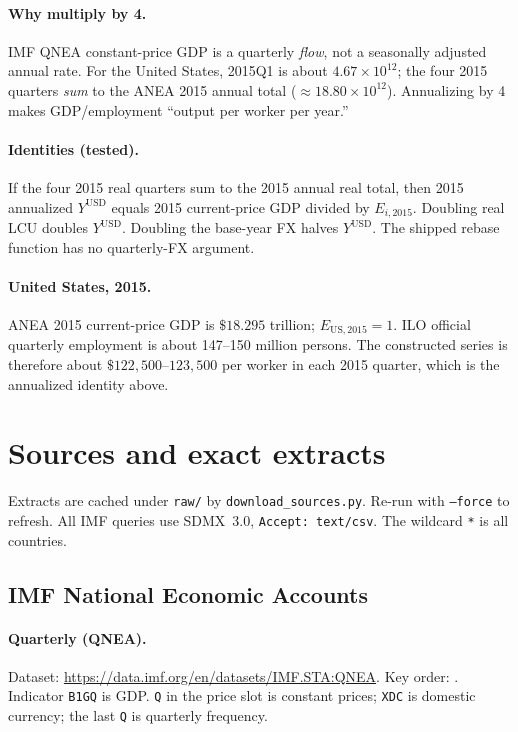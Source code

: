 \documentclass[11pt]{article}
\begin{document}
\paragraph{Why multiply by 4.}
IMF QNEA constant-price GDP is a quarterly \emph{flow}, not a seasonally
adjusted annual rate. For the United States, 2015Q1 is about
$4.67\times 10^{12}$; the four 2015 quarters \emph{sum} to the ANEA 2015 annual
total ($\approx 18.80\times 10^{12}$). Annualizing by 4 makes GDP/employment
``output per worker per year.''

\paragraph{Identities (tested).}
If the four 2015 real quarters sum to the 2015 annual real total, then 2015
annualized $Y^{\mathrm{USD}}$ equals 2015 current-price GDP divided by
$E_{i,2015}$. Doubling real LCU doubles $Y^{\mathrm{USD}}$. Doubling the
base-year FX halves $Y^{\mathrm{USD}}$. The shipped rebase function has no
quarterly-FX argument.

\paragraph{United States, 2015.}
ANEA 2015 current-price GDP is $\$18.295$ trillion; $E_{\mathrm{US},2015}=1$.
ILO official quarterly employment is about 147--150 million persons. The
constructed series is therefore about $\$122{,}500$--$123{,}500$ per worker in
each 2015 quarter, which is the annualized identity above.

\section{Sources and exact extracts}
\label{sec:sources}

Extracts are cached under \texttt{raw/} by \texttt{download\_sources.py}.
Re-run with \texttt{--force} to refresh. All IMF queries use SDMX~3.0,
\texttt{Accept: text/csv}. The wildcard \texttt{*} is all countries.

\subsection{IMF National Economic Accounts}

\paragraph{Quarterly (QNEA).}
Dataset: \url{https://data.imf.org/en/datasets/IMF.STA:QNEA}.
Key order:
.
Indicator \texttt{B1GQ} is GDP. \texttt{Q} in the price slot is constant
prices; \texttt{XDC} is domestic currency; the last \texttt{Q} is quarterly
frequency.
\end{document}
